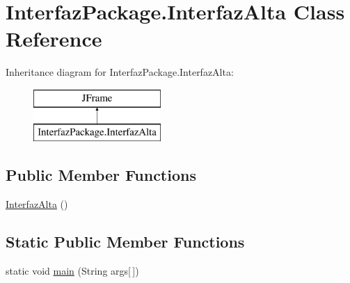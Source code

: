 \hypertarget{class_interfaz_package_1_1_interfaz_alta}{}\section{Interfaz\+Package.\+Interfaz\+Alta Class Reference}
\label{class_interfaz_package_1_1_interfaz_alta}
Inheritance diagram for Interfaz\+Package.\+Interfaz\+Alta\+:\begin{figure}[H]
\begin{center}
\leavevmode
\includegraphics[height=2.000000cm]{class_interfaz_package_1_1_interfaz_alta}
\end{center}
\end{figure}
\subsection*{Public Member Functions}
\begin{DoxyCompactItemize}
\item 
\mbox{\hyperlink{class_interfaz_package_1_1_interfaz_alta_a34f6dce200e1d6e15b1619d6413e6330}{Interfaz\+Alta}} ()
\end{DoxyCompactItemize}
\subsection*{Static Public Member Functions}
\begin{DoxyCompactItemize}
\item 
static void \mbox{\hyperlink{class_interfaz_package_1_1_interfaz_alta_ad18e438644c48cb52567b3878609a129}{main}} (String args\mbox{[}$\,$\mbox{]})
\end{DoxyCompactItemize}
